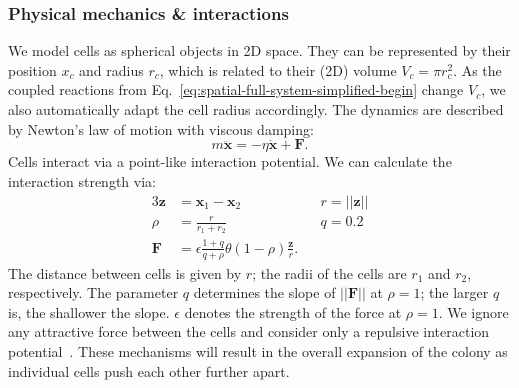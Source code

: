 \documentclass[10pt,1p,authoryear]{elsarticle}
\numberwithin{equation}{section}
\begin{document}
\subsubsection{Physical mechanics \& interactions}
We model cells as spherical objects in 2D space. They can be represented by their position $x_c$ and radius $r_c$, which is related to their (2D) volume $V_c = \pi r_c^2$.
As the coupled reactions from Eq.~\eqref{eq:spatial-full-system-simplified-begin} change $V_c$, we also automatically adapt the cell radius accordingly.
The dynamics are described by Newton's law of motion with viscous damping:
\begin{equation}
    m \ddot{\mathbf{x}} = -\eta\dot{\mathbf{x}} + \mathbf{F}.
\end{equation}
Cells interact via a point-like interaction potential. We can calculate the interaction strength via:
\begin{alignat}{3}
    \mathbf{z} &= \mathbf{x}_1 - \mathbf{x}_2 \hspace{2em}&& r = ||\mathbf{z}||\\
    \rho &= \frac{r}{r_1+r_2} && q=0.2\\
    \mathbf{F} &= \epsilon \frac{1+q}{q+\rho} \theta(1 - \rho) \frac{\mathbf{z}}{r}.
\end{alignat}
The distance between cells is given by $r$; the radii of the cells are $r_1$ and $r_2$, respectively. The parameter $q$ determines the slope of $||\mathbf{F}||$ at $\rho=1$; the larger $q$ is, the shallower the slope. $\epsilon$ denotes the strength of the force at $\rho=1$. 
We ignore any attractive force between the cells and consider only a repulsive interaction potential~\citep{Garrett2008}.
These mechanisms will result in the overall expansion of the colony as individual cells push each other further apart.
%
\end{document}
